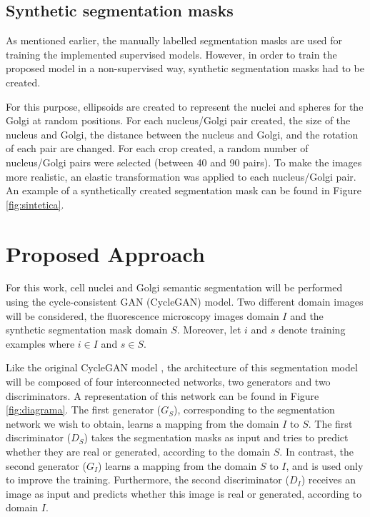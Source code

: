 \subsection{Synthetic segmentation masks}
\label{subsection:synthetic_masks}

As mentioned earlier, the manually labelled segmentation masks are used for training the implemented supervised models. However, in order to train the proposed model in a non-supervised way, synthetic segmentation masks had to be created. 

For this purpose, ellipsoids are created to represent the nuclei and spheres for the Golgi at random positions. For each nucleus/Golgi pair created, the size of the nucleus and Golgi, the distance between the nucleus and Golgi, and the rotation of each pair are changed. For each crop created, a random number of nucleus/Golgi pairs were selected (between 40 and 90 pairs). To make the images more realistic, an elastic transformation was applied to each nucleus/Golgi pair. An example of a synthetically created segmentation mask can be found in Figure \ref{fig:sintetica}.



\section{Proposed Approach}
\label{section:proposed}

For this work, cell nuclei and Golgi semantic segmentation will be performed using the cycle-consistent GAN (CycleGAN) model. Two different domain images will be considered, the fluorescence microscopy images domain $I$ and the synthetic segmentation mask domain $S$. Moreover, let $i$ and $s$ denote training examples where $i \in I$ and $s \in S$.

Like the original CycleGAN model \cite{cycleGAN:original}, the architecture of this segmentation model will be composed of four interconnected networks, two generators and two discriminators. A representation of this network can be found in Figure \ref{fig:diagrama}. The first generator ($G_S$), corresponding to the segmentation network we wish to obtain, learns a mapping from the domain $I$ to $S$. The first discriminator ($D_S$) takes the segmentation masks as input and tries to predict whether they are real or generated, according to the domain $S$. In contrast, the second generator ($G_I$) learns a mapping from the domain $S$ to $I$, and is used only to improve the training. Furthermore, the second discriminator ($D_I$) receives an image as input and predicts whether this image is real or generated, according to domain $I$.

